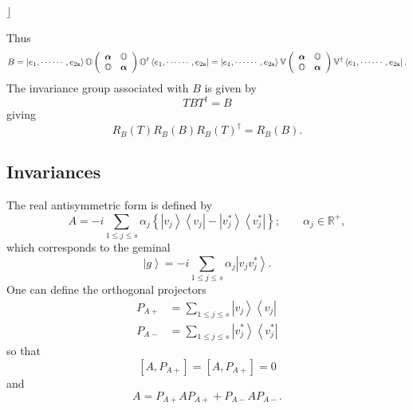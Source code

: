 \documentclass[aps,preprint]{revtex4}%
\begin{document}
$\rfloor$

Thus
\begin{equation}
B=\left\vert e_{1},\cdots\cdots,e_{2\mathbf{s}}\right\rangle \mathbb{O}\left(
%
\begin{array}
[c]{cc}%
\boldsymbol{\alpha} & \mathbb{O}\\
\mathbb{O} & \boldsymbol{\alpha}%
\end{array}
\right)  \mathbb{O}^{t}\left\langle e_{1},\cdots\cdots,e_{2\mathbf{s}%
}\right\vert =\left\vert e_{1},\cdots\cdots,e_{2\mathbf{s}}\right\rangle
\mathbb{V}\left(
\begin{array}
[c]{cc}%
\boldsymbol{\alpha} & \mathbb{O}\\
\mathbb{O} & \boldsymbol{\alpha}%
\end{array}
\right)  \mathbb{V}^{\dagger}\left\langle e_{1},\cdots\cdots,e_{2\mathbf{s}%
}\right\vert .
\end{equation}
The invariance group associated with $B$ is given by
\begin{equation}
TBT^{\dagger}=B
\end{equation}
giving
\begin{equation}
R_{B}\left(  T\right)  R_{B}\left(  B\right)  R_{B}\left(  T\right)
^{\dagger}=R_{B}\left(  B\right)  .
\end{equation}


\subsection{Invariances}

The real antisymmetric form is defined by
\begin{equation}
A=-i\sum_{1\leq j\leq s}\alpha_{j}\left\{  \left\vert v_{j}\right\rangle
\left\langle v_{j}\right\vert -\left\vert v_{j}^{\ast}\right\rangle
\left\langle v_{j}^{\ast}\right\vert \right\}  ;\qquad\alpha_{j}\in
\mathbb{R}^{+},
\end{equation}
which corresponds to the geminal%
\begin{equation}
\left\vert g\right\rangle =-i\sum_{1\leq j\leq s}\alpha_{j}\left\vert
v_{j}v_{j}^{\ast}\right\rangle .
\end{equation}
One can define the orthogonal projectors
\begin{align}
P_{A+}  &  =\sum_{1\leq j\leq s}\left\vert v_{j}\right\rangle \left\langle
v_{j}\right\vert \\
P_{A-}  &  =\sum_{1\leq j\leq s}\left\vert v_{j}^{\ast}\right\rangle
\left\langle v_{j}^{\ast}\right\vert
\end{align}
so that
\begin{equation}
\left[  A,P_{A+}\right]  =\left[  A,P_{A+}\right]  =0
\end{equation}
and
\begin{equation}
A=P_{A+}AP_{A+}+P_{A-}AP_{A-}.
\end{equation}
\end{document}
